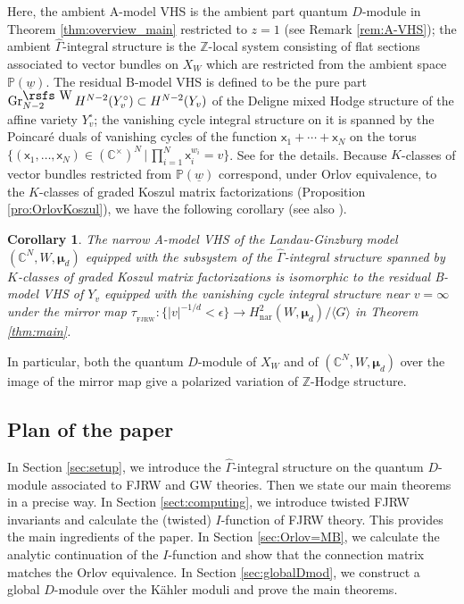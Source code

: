 \documentclass[11pt]{amsart}
\newtheorem{cor}[thm]{Corollary} %
\theoremstyle{definition} %
\theoremstyle{remark} %
\newcommand{\CC}{\mathbb C}
\newcommand{\PP}{\mathbb P}
\newcommand{\ZZ}{\mathbb Z}
\newcommand{\nar}{\operatorname{nar}}
\newcommand{\marsfs}[1]{\mbox{\rsfs #1}}
\newcommand{\bmu}{\boldsymbol{\mu}}
\newcommand{\sFJRW}{\operatorname{_{FJRW}}}
\newcommand{\Gr}{\operatorname{Gr}} %
\newcommand{\hGamma}{\widehat{\Gamma}}
\newcommand{\sfx}{\mathsf{x}}
\newcommand{\rsW}{\marsfs{W}}
\newcommand{\uw}{\underline{w}}
\begin{document}
Here, the ambient A-model VHS is the ambient part 
quantum $D$-module in Theorem \ref{thm:overview_main}
restricted to $z=1$ (see Remark \ref{rem:A-VHS}); 
the ambient $\hGamma$-integral structure is the $\ZZ$-local 
system consisting of flat sections associated 
to vector bundles on $X_W$ 
which are restricted from the ambient space $\PP(\uw)$. 
The residual B-model VHS is defined to be   
the pure part $\Gr^{\rsW}_{N-2} H^{N-2}(Y_v^\circ) \subset H^{N-2}(Y_v)$ 
of the Deligne mixed Hodge structure 
of the affine variety $Y_v^\circ$; 
the vanishing cycle integral structure on it 
is spanned by the Poincar\'{e} duals of vanishing cycles 
of the function $\sfx_1+ \cdots + \sfx_N$ on the torus 
$\{(\sfx_1,\dots,\sfx_N)\in (\CC^\times)^N\,|\, 
\prod_{i=1}^N \sfx_i^{w_i} = v\}$. 
See \cite{Iritani:period} for the details. 
Because $K$-classes of vector bundles restricted from $\PP(\uw)$ correspond, 
under Orlov equivalence, to the $K$-classes of 
graded Koszul matrix factorizations (Proposition \ref{pro:OrlovKoszul}), 
we have the following corollary 
(see also \cite[Conjecture 4.2.11]{CR:LGconference}). 

\begin{cor} 
The narrow A-model VHS of the Landau-Ginzburg model 
$(\CC^N,W,\bmu_d)$ equipped with the subsystem of the 
$\hGamma$-integral structure 
spanned by $K$-classes of graded Koszul matrix factorizations 
is isomorphic to the residual B-model VHS of $Y_v$ 
equipped with the vanishing cycle integral structure 
near $v=\infty$ under the mirror map 
$\tau_{\sFJRW} \colon 
\{|v|^{-1/d} <\epsilon\} \to H_{\nar}^2(W,\bmu_d)/\langle G\rangle$ 
in Theorem \ref{thm:main}.  
\end{cor} 

In particular, both the quantum $D$-module of $X_W$ 
and of $(\CC^N,W,\bmu_d)$ over the image of the mirror map 
give a polarized variation of $\ZZ$-Hodge structure. 

\subsection{Plan of the paper} 
In Section \ref{sec:setup}, we introduce 
the $\hGamma$-integral structure on the quantum $D$-module
associated to FJRW and GW theories. 
Then we state our main theorems in a precise way. 
In Section \ref{sect:computing}, we introduce twisted 
FJRW invariants and calculate 
the (twisted) $I$-function of FJRW theory. 
This provides the main ingredients of the paper. 
In Section \ref{sec:Orlov=MB}, we calculate 
the analytic continuation of the $I$-function 
and show that the connection matrix 
matches the Orlov equivalence. 
In Section \ref{sec:globalDmod}, we construct a 
global $D$-module over the K\"{a}hler moduli 
and prove the main theorems. 
\end{document}
